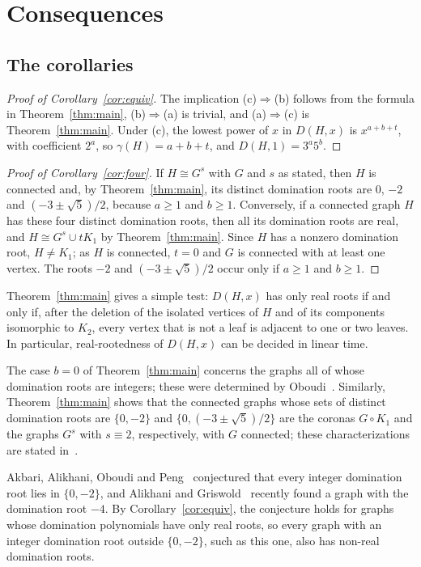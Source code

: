 \documentclass{amsart}
\theoremstyle{definition}
\theoremstyle{remark}
\numberwithin{equation}{section}
\begin{document}
\section{Consequences}\label{sec:consequences}

\subsection{The corollaries}

\begin{proof}[Proof of Corollary~\ref{cor:equiv}]
The implication (c)$\Rightarrow$(b) follows from the formula in Theorem~\ref{thm:main}, (b)$\Rightarrow$(a) is trivial, and (a)$\Rightarrow$(c) is Theorem~\ref{thm:main}. Under (c), the lowest power of $x$ in $D(H,x)$ is $x^{a+b+t}$, with coefficient $2^a$, so $\gamma(H)=a+b+t$, and $D(H,1)=3^a5^b$.
\end{proof}

\begin{proof}[Proof of Corollary~\ref{cor:four}]
If $H\cong G^s$ with $G$ and $s$ as stated, then $H$ is connected and, by Theorem~\ref{thm:main}, its distinct domination roots are $0$, $-2$ and $(-3\pm\sqrt5)/2$, because $a\ge1$ and $b\ge1$. Conversely, if a connected graph $H$ has these four distinct domination roots, then all its domination roots are real, and $H\cong G^s\cup tK_1$ by Theorem~\ref{thm:main}. Since $H$ has a nonzero domination root, $H\neq K_1$; as $H$ is connected, $t=0$ and $G$ is connected with at least one vertex. The roots $-2$ and $(-3\pm\sqrt5)/2$ occur only if $a\ge1$ and $b\ge1$.
\end{proof}

Theorem~\ref{thm:main} gives a simple test: $D(H,x)$ has only real roots if and only if, after the deletion of the isolated vertices of $H$ and of its components isomorphic to $K_2$, every vertex that is not a leaf is adjacent to one or two leaves. In particular, real-rootedness of $D(H,x)$ can be decided in linear time.

The case $b=0$ of Theorem~\ref{thm:main} concerns the graphs all of whose domination roots are integers; these were determined by Oboudi~\cite[Theorem~13]{Obo16}. Similarly, Theorem~\ref{thm:main} shows that the connected graphs whose sets of distinct domination roots are $\{0,-2\}$ and $\{0,(-3\pm\sqrt5)/2\}$ are the coronas $G\circ K_1$ and the graphs $G^s$ with $s\equiv2$, respectively, with $G$ connected; these characterizations are stated in~\cite[Theorems~5 and~6]{Ali11s}.

Akbari, Alikhani, Oboudi and Peng~\cite{AAOP10} conjectured that every integer domination root lies in $\{0,-2\}$, and Alikhani and Griswold~\cite{AG26} recently found a graph with the domination root $-4$. By Corollary~\ref{cor:equiv}, the conjecture holds for graphs whose domination polynomials have only real roots, so every graph with an integer domination root outside $\{0,-2\}$, such as this one, also has non-real domination roots.
\end{document}

